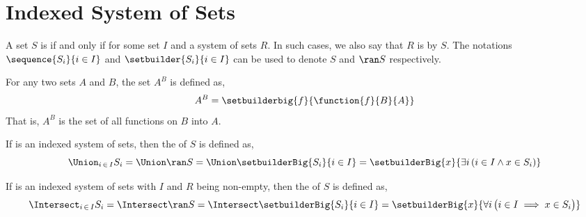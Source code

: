 \newpage
\section{Indexed System of Sets}

\begin{dfn}
    \label{dfn:indexed-system-of-sets}
    A set \( S \) is 
    if and only if  for some set \( I \) and
    a system of sets \( R \). In such cases, we also say that \( R \)
    is  by \( S \). The notations \( \sequence{ S_{i} }{ i \in I } \)
    and \( \setbuilder{S_{i}}{i \in I } \) can be used to denote \( S \) and \( \ran S \)
    respectively.
\end{dfn}

\begin{dfn}
    \label{dfn:set-exponentiation}
    For any two sets \( A \) and \( B \), the set \( A^{B} \) is defined as,
    \begin{equation*}
        A^{B} = \setbuilderbig{f}{\function{f}{B}{A}}
    \end{equation*}
    That is, \( A^{B} \) is the set of all functions on \( B \) into \( A \).
\end{dfn}

\begin{dfn}[Union]
    \label{dfn:union-of-indexed-system-of-sets}
    If  is an indexed system of sets, then the  of \( S \) is defined
    as,
    \begin{equation*}
        \Union_{i \,\in\, I} S_{i}
        = \Union \ran S
        = \Union \setbuilderBig{S_{i}}{i \in I}
        = \setbuilderBig{x}{\exists i \, \mleft( i \in I \land x \in S_{i} \mright)}
    \end{equation*}
\end{dfn}

\begin{dfn}[Intersection]
    \label{dfn:intersection-of-indexed-system-of-sets}
    If  is an indexed system of sets with \( I \) and \( R \) being non-empty,
    then the  of \( S \) is defined as,
    \begin{equation*}
        \Intersect_{i \,\in\, I} S_{i}
        = \Intersect \ran S
        = \Intersect \setbuilderBig{S_{i}}{i \in I}
        = \setbuilderBig{x}{\forall i \, \big( i \in I \implies x \in S_{i} \big)}
    \end{equation*}
\end{dfn}

